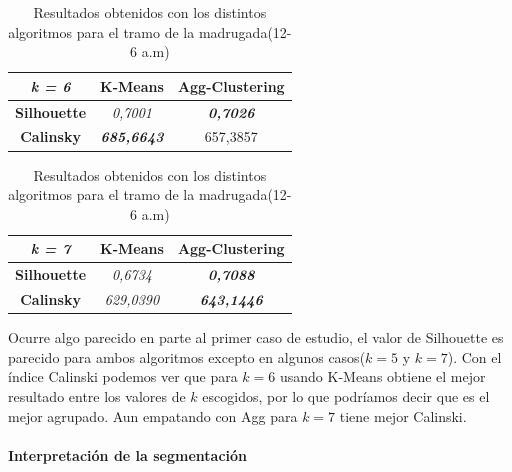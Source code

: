 \begin{table}[H]
\begin{subtable}[H]{0.45\textwidth}
        \centering
\begin{tabular}{|c|c|c|}
\hline
\textit{k = 6}      & \textbf{K-Means}           & \textbf{Agg-Clustering}  \\ \hline
\textbf{Silhouette} & \textit{0,7001}            & \textit{\textbf{0,7026}} \\ \hline
\textbf{Calinsky}   & \textit{\textbf{685,6643}} & 657,3857                 \\ \hline
\end{tabular}
\end{subtable}
\begin{subtable}[H]{0.45\textwidth}
        \centering
\begin{tabular}{|c|c|c|}
\hline
\textit{k = 7}      & \textbf{K-Means}  & \textbf{Agg-Clustering}    \\ \hline
\textbf{Silhouette} & \textit{0,6734}   & \textit{\textbf{0,7088}}   \\ \hline
\textbf{Calinsky}   & \textit{629,0390} & \textit{\textbf{643,1446}} \\ \hline
\end{tabular}
\end{subtable}
\hfill
\caption{Resultados obtenidos con los distintos algoritmos para el tramo de la madrugada(12-6 a.m)}
\end{table}

Ocurre algo parecido en parte al primer caso de estudio, el valor de Silhouette es parecido para ambos algoritmos excepto en algunos casos($k=5$ y $k=7$). Con el índice Calinski podemos ver que para $k=6$ usando K-Means obtiene el mejor resultado entre los valores de $k$ escogidos, por lo que podríamos decir que es el mejor agrupado. Aun empatando con Agg para $k=7$ tiene mejor Calinski.

\paragraph{Interpretación de la segmentación}

